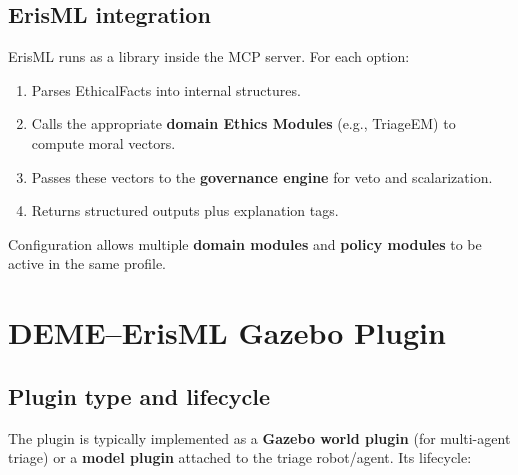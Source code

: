 \documentclass[11pt]{article}
\begin{document}
\subsection{ErisML integration}

ErisML runs as a library inside the MCP server. For each option:

\begin{enumerate}
  \item Parses EthicalFacts into internal structures.
  \item Calls the appropriate \textbf{domain Ethics Modules} (e.g., TriageEM) to compute moral vectors.
  \item Passes these vectors to the \textbf{governance engine} for veto and scalarization.
  \item Returns structured outputs plus explanation tags.
\end{enumerate}

Configuration allows multiple \textbf{domain modules} and \textbf{policy modules} to be active in the same profile.

\section{DEME--ErisML Gazebo Plugin}

\subsection{Plugin type and lifecycle}

The plugin is typically implemented as a \textbf{Gazebo world plugin} (for multi-agent triage) or a \textbf{model plugin} attached to the triage robot/agent. Its lifecycle:
\end{document}
